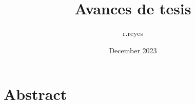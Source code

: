 \documentclass{book}
\title{Avances de tesis}
\author{r.reyes }
\date{December 2023}
\begin{document}
\begin{titlepage}

\end{titlepage}




\chapter*{Abstract}
\end{document}
